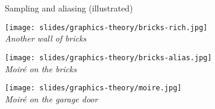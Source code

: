 \begin{frame}{Sampling and aliasing (illustrated)}
  \begin{minipage}[b]{0.29\textwidth}
    \centering
    \texttt{[image: slides/graphics-theory/bricks-rich.jpg]}\\
    \textit{\small Another wall of bricks}
  \end{minipage}
  \hfill
  \begin{minipage}[b]{0.29\textwidth}
    \centering
    \texttt{[image: slides/graphics-theory/bricks-alias.jpg]}\\
    \textit{\small Moiré on the bricks}
  \end{minipage}
  \hfill
  \begin{minipage}[b]{0.29\textwidth}
    \centering
    \texttt{[image: slides/graphics-theory/moire.jpg]}\\
    \textit{\small Moiré on the garage door}
  \end{minipage}
\end{frame}

